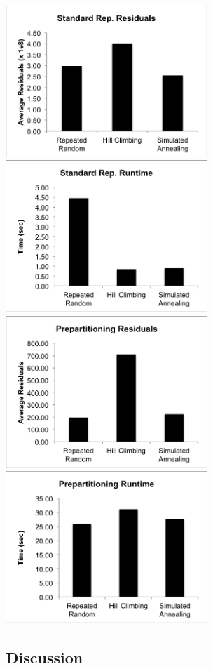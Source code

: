 \documentclass[a4paper]{article}
\begin{document}
	\includegraphics[width=3in]{ss_resid}
	\includegraphics[width=3in]{ss_time}\\
	\includegraphics[width=3in]{pp_resid}
	\includegraphics[width=3in]{pp_time}
	
	\subsection{Discussion}
	
\end{document}
